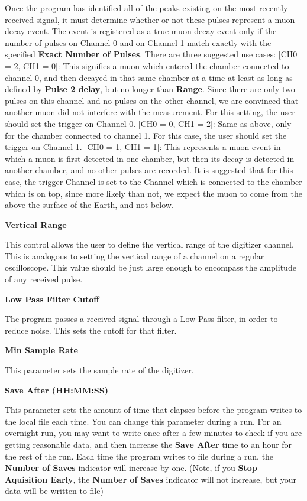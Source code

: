 \documentclass{../lab}
\begin{document}
Once the program has identified all of the peaks existing on the most recently received signal, it must determine whether or not these pulses represent a muon decay event. The event is registered as a true muon decay event only if the number of pulses on Channel 0 and on Channel 1 match exactly with the specified \textbf{Exact Number of Pulses}. There are three suggested use cases: [CH0 = 2, CH1 = 0]: This signifies a muon which entered the chamber connected to channel 0, and then decayed in that same chamber at a time at least as long as defined by \textbf{Pulse 2 delay}, but no longer than \textbf{Range}. Since there are only two pulses on this channel and no pulses on the other channel, we are convinced that another muon did not interfere with the measurement. For this setting, the user should set the trigger on Channel 0. [CH0 = 0, CH1 = 2]: Same as above, only for the chamber connected to channel 1. For this case, the user should set the trigger on Channel 1. [CH0 = 1, CH1 = 1]: This represents a muon event in which a muon is first detected in one chamber, but then its decay is detected in another chamber, and no other pulses are recorded. It is suggested that for this case, the trigger Channel is set to the Channel which is connected to the chamber which is on top, since more likely than not, we expect the muon to come from the above the surface of the Earth, and not below.

\textbf{Vertical Range}

This control allows the user to define the vertical range of the digitizer channel. This is analogous to setting the vertical range of a channel on a regular oscilloscope. This value should be just large enough to encompass the amplitude of any received pulse.

\textbf{Low Pass Filter Cutoff}

The program passes a received signal through a Low Pass filter, in order to reduce noise. This sets the cutoff for that filter.

\textbf{Min Sample Rate}

This parameter sets the sample rate of the digitizer.

\textbf{Save After (HH:MM:SS)}

This parameter sets the amount of time that elapses before the program writes to the local file each time. You can change this parameter during a run. For an overnight run, you may want to write once after a few minutes to check if you are getting reasonable data, and then increase the \textbf{Save After} time to an hour for the rest of the run. Each time the program writes to file during a run, the \textbf{Number of Saves} indicator will increase by one. (Note, if you \textbf{Stop Aquisition Early}, the \textbf{Number of Saves} indicator will not increase, but your data will be written to file)
\end{document}
